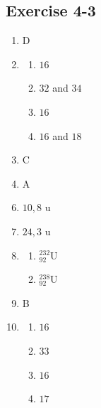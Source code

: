 \subsection{Exercise 4-3}
\begin{multicols}{5}
\begin{enumerate}[noitemsep, label=\textbf{\arabic*}. ]
 \item %
D
 \item %
\begin{enumerate}[noitemsep, label=\textbf{\alph*}. ]
 \item $16$
\item $32$ and $34$
\item $16$
\item $16$ and $18$
\end{enumerate}
 \item %
C
 \item %
A
\end{enumerate}
\begin{enumerate}[noitemsep, label=\textbf{\arabic*}. ]
\setcounter{enumi}{5}
 \item %
$10,8 \text{ u}$
 \item %
$24,3 \text{ u}$
\item %
\begin{enumerate}[noitemsep, label=\textbf{\alph*}. ]
 \item $^{232}_{92}\text{U}$
\item $^{238}_{92}\text{U}$
\end{enumerate}
\item %
B
\item %
\begin{enumerate}[noitemsep, label=\textbf{\alph*}. ]
 \item $16$
\item  $33$
\item $16$
\item $17$
\end{enumerate}
\end{enumerate}
\end{multicols}
